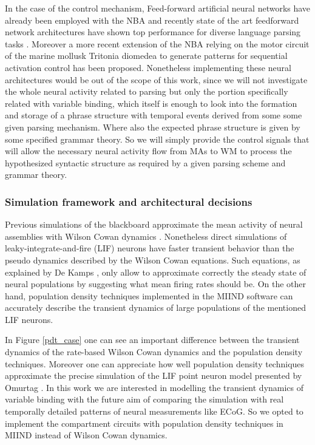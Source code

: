 \documentclass[10pt]{article}
\begin{document}
In the case of the control mechanism, Feed-forward artificial neural
networks have already been employed with the NBA
\cite{van_der_Velde_2010} and recently state of the art feedforward
network architectures have shown top performance for diverse language
parsing tasks \cite{Andor_2016}. Moreover a more recent extension of
the NBA relying on the motor circuit of the marine mollusk Tritonia
diomedea to generate patterns for sequential activation control has
been proposed\cite{van_Dijk_2015}. Nonetheless implementing these
neural architectures would be out of the scope of this work, since we
will not investigate the whole neural activity related to parsing but
only the portion specifically related with variable binding, which
itself is enough to look into the formation and storage of a phrase
structure with temporal events derived from some some given parsing
mechanism. Where also the expected phrase structure is given by some
specified grammar theory. So we will simply provide the control
signals that will allow the necessary neural activity flow from MAs to
WM to process the hypothesized syntactic structure as required by a
given parsing scheme and grammar theory.

\subsubsection{Simulation framework and architectural
  decisions}\label{simulation-framework-and-architectural-decisions}

Previous simulations of the blackboard approximate the mean activity
of neural assemblies with Wilson Cowan dynamics \cite{Frank_2014}.
Nonetheless direct simulations of leaky-integrate-and-fire (LIF)
neurons \cite{omurtag2000simulation} have faster transient behavior
than the pseudo dynamics described by the Wilson Cowan equations. Such
equations, as explained by De Kamps \cite{de_Kamps_2008}, only allow
to approximate correctly the steady state of neural populations by
suggesting what mean firing rates should be. On the other hand,
population density techniques \cite{de2013generic} implemented in the
MIIND software \cite{de_Kamps_2008} \cite{harrison2011new} can
accurately describe the transient dynamics of large populations of the
mentioned LIF neurons.

In Figure \ref{pdt_case} one can see an important difference between
the transient dynamics of the rate-based Wilson Cowan dynamics and the
population density techniques. Moreover one can appreciate how well
population density techniques approximate the precise simulation of
the LIF point neuron model presented by Omurtag
\cite{omurtag2000simulation}. In this work we are interested in
modelling the transient dynamics of variable binding with the future
aim of comparing the simulation with real temporally detailed patterns
of neural measurements like ECoG. So we opted to implement the
compartment circuits with population density techniques in MIIND
instead of Wilson Cowan dynamics.
\end{document}
